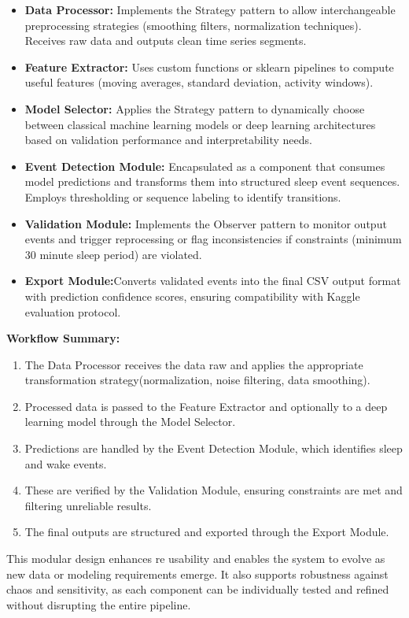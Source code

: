 \documentclass[conference]{IEEEtran}
\begin{document}
\begin{itemize}
\item \textbf{Data Processor:} Implements the Strategy pattern to allow interchangeable preprocessing strategies (smoothing filters, normalization techniques). Receives raw data and outputs clean time series segments.
\item \textbf{Feature Extractor:} Uses custom functions or sklearn pipelines to compute useful features (moving averages, standard deviation, activity windows).

\item \textbf{Model Selector:} Applies the Strategy pattern to dynamically choose between classical machine learning models or deep learning architectures based on validation performance and interpretability needs.


\item \textbf{Event Detection Module:} Encapsulated as a component that consumes model predictions and transforms them into structured sleep event sequences. Employs thresholding or sequence labeling to identify transitions.

\item \textbf{Validation Module:} Implements the Observer pattern to monitor output events and trigger reprocessing or flag inconsistencies if constraints (minimum 30 minute sleep period) are violated.

\item \textbf{Export Module:}Converts validated events into the final CSV output format with prediction confidence scores, ensuring compatibility with Kaggle evaluation protocol.
\end{itemize}

\textbf{Workflow Summary:}

\begin{enumerate}
\item The Data Processor receives the data raw and applies the appropriate transformation strategy(normalization, noise filtering, data smoothing).
\item Processed data is passed to the Feature Extractor and optionally to a deep learning model through the Model Selector.
\item Predictions are handled by the Event Detection Module, which identifies sleep and wake events.

\item These are verified by the Validation Module, ensuring constraints are met and filtering unreliable results.

\item The final outputs are structured and exported through the Export Module.
\end{enumerate}

This modular design enhances re usability and enables the system to evolve as new data or modeling requirements emerge. It also supports robustness against chaos and sensitivity, as each component can be individually tested and refined without disrupting the entire pipeline.
\end{document}
